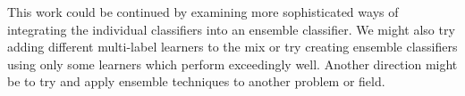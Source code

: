 This work could be continued by examining more sophisticated ways of
integrating the individual classifiers into an ensemble classifier. We
might also try adding different multi-label learners to the mix or try
creating ensemble classifiers using only some learners which perform
exceedingly well. Another direction might be to try and apply ensemble
techniques to another problem or field.
